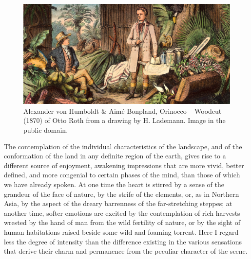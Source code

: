 \begin{figure}[h]
    \includegraphics[width=1\textwidth]{../../pictures/Humboldt&Bonpland_Orenoque}
    \caption{\small Alexander von Humboldt \& Aim\'e Bonpland, Orinocco -- Woodcut (1870) of Otto
       Roth from a drawing by H. Lademann. Image in the public domain.}
 \end{figure}

The contemplation of the individual characteristics of the landscape, and of the conformation of the land in any definite region of the earth, gives rise to a different source of enjoyment, awakening impressions that are more vivid, better defined, and more congenial to certain phases of the mind, than those of which we have already spoken. At one time the heart is stirred by a sense of the grandeur of the face of nature, by the strife of the elements, or, as in Northern Asia, by the aspect of the dreary barrenness of the far-stretching steppes; at another time, softer emotions are excited by the contemplation of rich harvests wrested by the hand of man from the wild fertility of nature, or by the sight of human habitations raised beside some wild and foaming torrent. Here I regard less the degree of intensity than the difference existing in the various sensations that derive their charm and permanence from the peculiar character of the scene.

